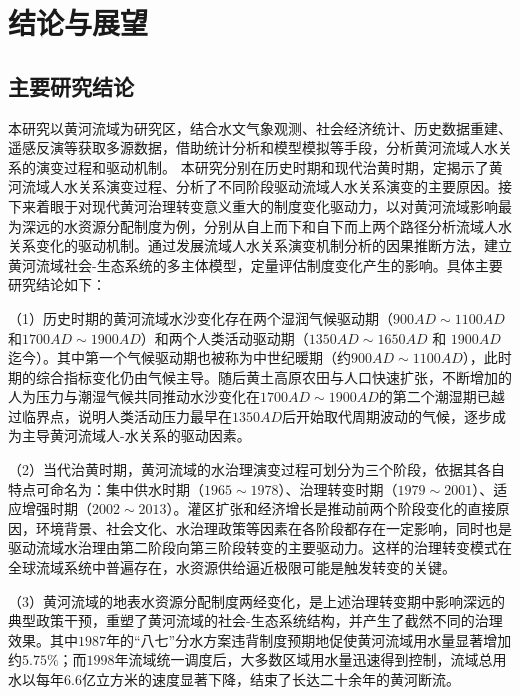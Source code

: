 \chapter{结论与展望}

\section{主要研究结论}

本研究以黄河流域为研究区，结合水文气象观测、社会经济统计、历史数据重建、遥感反演等获取多源数据，借助统计分析和模型模拟等手段，分析黄河流域人水关系的演变过程和驱动机制。
本研究分别在历史时期和现代治黄时期，定揭示了黄河流域人水关系演变过程、分析了不同阶段驱动流域人水关系演变的主要原因。接下来着眼于对现代黄河治理转变意义重大的制度变化驱动力，以对黄河流域影响最为深远的水资源分配制度为例，分别从自上而下和自下而上两个路径分析流域人水关系变化的驱动机制。通过发展流域人水关系演变机制分析的因果推断方法，建立黄河流域社会-生态系统的多主体模型，定量评估制度变化产生的影响。具体主要研究结论如下：

（1）历史时期的黄河流域水沙变化存在两个湿润气候驱动期（$900AD\sim1100AD$和$1700AD\sim1900AD$）和两个人类活动驱动期（$1350AD \sim 1650AD$ 和 $1900AD$迄今）。其中第一个气候驱动期也被称为中世纪暖期（约$900AD \sim 1100AD$），此时期的综合指标变化仍由气候主导。随后黄土高原农田与人口快速扩张，不断增加的人为压力与潮湿气候共同推动水沙变化在$1700AD \sim 1900AD$的第二个潮湿期已越过临界点，说明人类活动压力最早在$1350AD$后开始取代周期波动的气候，逐步成为主导黄河流域人-水关系的驱动因素。

（2）当代治黄时期，黄河流域的水治理演变过程可划分为三个阶段，依据其各自特点可命名为：集中供水时期（$1965 \sim 1978$）、治理转变时期（$1979 \sim 2001$）、适应增强时期（$2002 \sim 2013$）。灌区扩张和经济增长是推动前两个阶段变化的直接原因，环境背景、社会文化、水治理政策等因素在各阶段都存在一定影响，同时也是驱动流域水治理由第二阶段向第三阶段转变的主要驱动力。这样的治理转变模式在全球流域系统中普遍存在，水资源供给逼近极限可能是触发转变的关键。

（3）黄河流域的地表水资源分配制度两经变化，是上述治理转变期中影响深远的典型政策干预，重塑了黄河流域的社会-生态系统结构，并产生了截然不同的治理效果。其中$1987$年的“八七”分水方案违背制度预期地促使黄河流域用水量显著增加约$5.75\%$；而$1998$年流域统一调度后，大多数区域用水量迅速得到控制，流域总用水以每年$6.6$亿立方米的速度显著下降，结束了长达二十余年的黄河断流。

